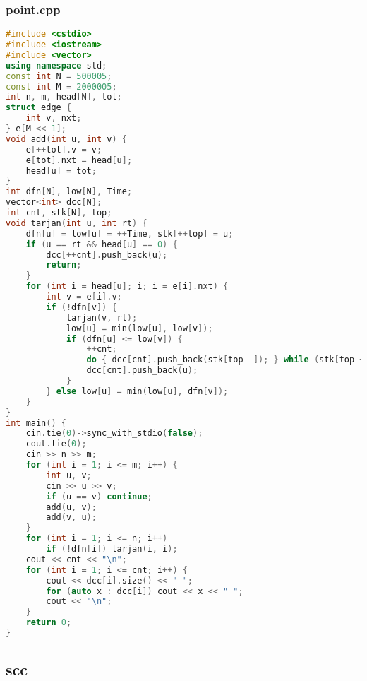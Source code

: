 \documentclass[9pt, a4paper, oneside]{book}
\begin{document}
\subsubsection{point.cpp}
\begin{lstlisting}[language={C++}]
#include <cstdio>
#include <iostream>
#include <vector>
using namespace std;
const int N = 500005;
const int M = 2000005;
int n, m, head[N], tot;
struct edge {
    int v, nxt;
} e[M << 1];
void add(int u, int v) {
    e[++tot].v = v;
    e[tot].nxt = head[u];
    head[u] = tot;
}
int dfn[N], low[N], Time;
vector<int> dcc[N];
int cnt, stk[N], top;
void tarjan(int u, int rt) {
    dfn[u] = low[u] = ++Time, stk[++top] = u;
    if (u == rt && head[u] == 0) {
        dcc[++cnt].push_back(u);
        return;
    }
    for (int i = head[u]; i; i = e[i].nxt) {
        int v = e[i].v;
        if (!dfn[v]) {
            tarjan(v, rt);
            low[u] = min(low[u], low[v]);
            if (dfn[u] <= low[v]) {
                ++cnt;
                do { dcc[cnt].push_back(stk[top--]); } while (stk[top + 1] != v);
                dcc[cnt].push_back(u);
            }
        } else low[u] = min(low[u], dfn[v]);
    }
}
int main() {
    cin.tie(0)->sync_with_stdio(false);
    cout.tie(0);
    cin >> n >> m;
    for (int i = 1; i <= m; i++) {
        int u, v;
        cin >> u >> v;
        if (u == v) continue;
        add(u, v);
        add(v, u);
    }
    for (int i = 1; i <= n; i++)
        if (!dfn[i]) tarjan(i, i);
    cout << cnt << "\n";
    for (int i = 1; i <= cnt; i++) {
        cout << dcc[i].size() << " ";
        for (auto x : dcc[i]) cout << x << " ";
        cout << "\n";
    }
    return 0;
}\end{lstlisting}
\subsection{scc}
\end{document}

